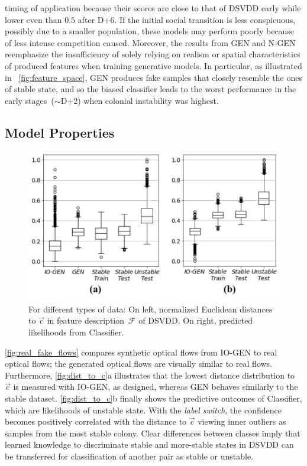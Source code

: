 \documentclass[letterpaper]{article} %
\let\orgautoref\autoref
\providecommand{\Autoref}
{\def\equationautorefname{Equation}%
\def\figureautorefname{Figure}%
\def\subfigureautorefname{Figure}%
\def\Itemautorefname{Item}%
\def\tableautorefname{Table}%
\def\exerciseautorefname{Exercise}%
\def\starexerciseautorefname{Exercise}%
\def\sectionautorefname{Section}%
\def\subsectionautorefname{Section}%
\def\subsubsectionautorefname{Section}%
\def\chapterautorefname{Section}%
\def\partautorefname{Part}%
\orgautoref}
\renewcommand{\autoref}
{\def\equationautorefname{Equation}%
\def\figureautorefname{Fig.}%
\def\subfigureautorefname{Fig.}%
\def\Itemautorefname{item}%
\def\tableautorefname{Table}%
\def\exerciseautorefname{Exercise}%
\def\starexerciseautorefname{Exercise}%
\def\sectionautorefname{Section}%
\def\subsectionautorefname{Section}%
\def\subsubsectionautorefname{Section}%
\def\chapterautorefname{Section}%
\def\partautorefname{Part}%
\orgautoref}
\begin{document}
timing of application because their scores are close to that of DSVDD
early while lower even than $0.5$ after D+6.
If the initial social transition is less conspicuous, possibly due to
a smaller population, these models may perform poorly because of less
intense competition caused.
Moreover, the results from GEN and \mbox{N-GEN}
reemphasize the insufficiency of solely relying on realism or
spatial characteristics of produced features when training generative
models.
In particular, as illustrated in~\autoref{fig:feature_space},
GEN produces fake samples that closely resemble the ones of stable state,
and so the biased classifier leads to the worst performance in
the early stages~($\sim$D+2) when colonial instability was highest.

\vspace{-1.61mm}
\subsection{Model Properties}
\label{sec:model_properties}


\begin{figure}
\centering
\includegraphics[trim={0pt 30pt 0pt 0pt},clip,width=.98\columnwidth]{dist_to_c}
\caption{For different types of data:
On left, normalized Euclidean distances to $\vec{c}$
in feature description~$\mathcal{F}$ of DSVDD.
On right, predicted likelihoods from Classifier.
}
\label{fig:dist_to_c}
\end{figure}
\Autoref{fig:real_fake_flows} compares synthetic optical flows from
\mbox{IO-GEN} to real optical flows; the generated optical flows are
visually similar to real flows. Furthermore, \autoref{fig:dist_to_c}a
illustrates that the lowest distance distribution to $\vec{c}$ is
measured with \mbox{IO-GEN}, as designed, whereas GEN behaves similarly to the
stable dataset. \Autoref{fig:dist_to_c}b finally shows the predictive
outcomes of Classifier, which are likelihoods of unstable state. With
the \emph{label switch}, the confidence becomes positively correlated
with the distance to $\vec{c}$ viewing inner outliers as samples from
the most stable colony. Clear differences between classes imply that
learned knowledge to discriminate stable and more-stable states in DSVDD
can be transferred for classification of another pair as stable or
unstable.
\end{document}
